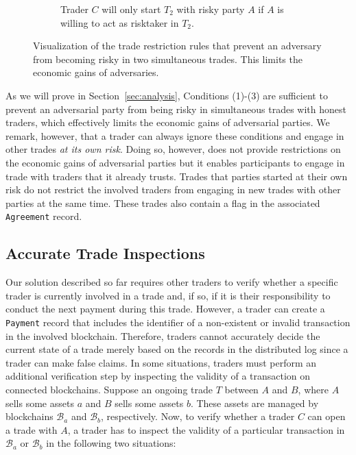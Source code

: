 \begin{figure}[t]
\begin{subfigure}[t]{.33\textwidth}
		\caption{Trader $ C $ will only start $ T_2 $ with risky party $ A $ if $ A $ is willing to act as risktaker in $ T_2 $.}
		\label{fig:trade_3}
	\end{subfigure}
	\caption{Visualization of the trade restriction rules that prevent an adversary from becoming risky in two simultaneous trades. This limits the economic gains of adversaries.}
	\label{fig:trade_rules}
\end{figure}

As we will prove in Section~\ref{sec:analysis}, Conditions (1)-(3) are sufficient to prevent an adversarial party from being risky in simultaneous trades with honest traders, which effectively limits the economic gains of adversarial parties.
We remark, however, that a trader can always ignore these conditions and engage in other trades \emph{at its own risk}.
Doing so, however, does not provide restrictions on the economic gains of adversarial parties but it enables participants to engage in trade with traders that it already trusts.
Trades that parties started at their own risk do not restrict the involved traders from engaging in new trades with other parties at the same time.
These trades also contain a flag in the associated \texttt{Agreement} record.

\subsection{Accurate Trade Inspections}
Our solution described so far requires other traders to verify whether a specific trader is currently involved in a trade and, if so, if it is their responsibility to conduct the next payment during this trade.
However, a trader can create a \texttt{Payment} record that includes the identifier of a non-existent or invalid transaction in the involved blockchain.
Therefore, traders cannot accurately decide the current state of a trade merely based on the records in the distributed log since a trader can make false claims.
In some situations, traders must perform an additional verification step by inspecting the validity of a transaction on connected blockchains.
Suppose an ongoing trade $ T $ between $ A $ and $ B $, where $ A $ sells some assets $ a $ and $ B $ sells some assets $ b $.
These assets are managed by blockchains $ \mathcal{B}_a $ and $ \mathcal{B}_b $, respectively.
Now, to verify whether a trader $ C $ can open a trade with $ A $, a trader has to inspect the validity of a particular transaction in $ \mathcal{B}_a $ or $ \mathcal{B}_b $ in the following two situations:

